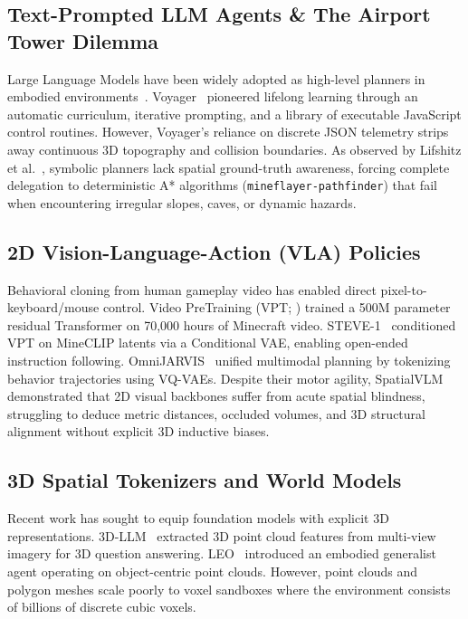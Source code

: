 \documentclass[10pt,twocolumn,letterpaper]{article}
\begin{document}
\subsection{Text-Prompted LLM Agents \& The Airport Tower Dilemma}
Large Language Models have been widely adopted as high-level planners in embodied environments~\cite{fan2022minedojo,wang2023voyager}. Voyager~\cite{wang2023voyager} pioneered lifelong learning through an automatic curriculum, iterative prompting, and a library of executable JavaScript control routines. However, Voyager's reliance on discrete JSON telemetry strips away continuous 3D topography and collision boundaries. As observed by Lifshitz et al.~\cite{lifshitz2023steve1}, symbolic planners lack spatial ground-truth awareness, forcing complete delegation to deterministic A* algorithms (\texttt{mineflayer-pathfinder}) that fail when encountering irregular slopes, caves, or dynamic hazards.

\subsection{2D Vision-Language-Action (VLA) Policies}
Behavioral cloning from human gameplay video has enabled direct pixel-to-keyboard/mouse control. Video PreTraining (VPT; \cite{baker2022video}) trained a 500M parameter residual Transformer on 70,000 hours of Minecraft video. STEVE-1~\cite{lifshitz2023steve1} conditioned VPT on MineCLIP latents via a Conditional VAE, enabling open-ended instruction following. OmniJARVIS~\cite{wang2024omnijarvis} unified multimodal planning by tokenizing behavior trajectories using VQ-VAEs. Despite their motor agility, SpatialVLM~\cite{chen2024spatialvlm} demonstrated that 2D visual backbones suffer from acute spatial blindness, struggling to deduce metric distances, occluded volumes, and 3D structural alignment without explicit 3D inductive biases.

\subsection{3D Spatial Tokenizers and World Models}
Recent work has sought to equip foundation models with explicit 3D representations. 3D-LLM~\cite{hong20233dllm} extracted 3D point cloud features from multi-view imagery for 3D question answering. LEO~\cite{huang2024leo} introduced an embodied generalist agent operating on object-centric point clouds. However, point clouds and polygon meshes scale poorly to voxel sandboxes where the environment consists of billions of discrete cubic voxels.
\end{document}
